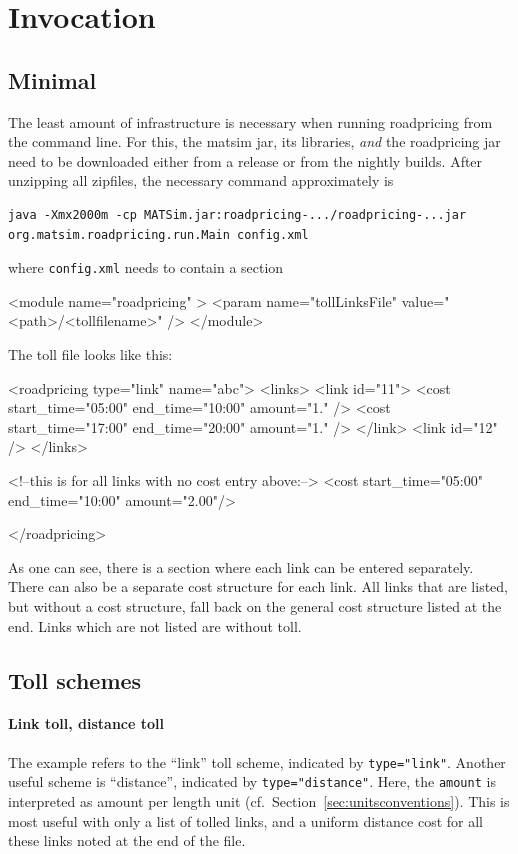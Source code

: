

\section{Invocation}

\subsection{Minimal}

The least amount of infrastructure is necessary when running roadpricing from the command line.  For this, the \acrshort{matsim} jar, its libraries, \emph{and} the roadpricing jar need to be downloaded either from a release or from the nightly builds.   After unzipping all zipfiles, the necessary command approximately is
\begin{lstlisting}
java -Xmx2000m -cp MATSim.jar:roadpricing-.../roadpricing-...jar org.matsim.roadpricing.run.Main config.xml  
\end{lstlisting}
where \lstinline$config.xml$ needs to contain a section
\begin{xml}
	<module name="roadpricing" >
		<param name="tollLinksFile" value="<path>/<tollfilename>" />
	</module>
\end{xml}
The toll file looks like this:
\begin{xml}
<roadpricing type="link" name="abc">
   <links>
      <link id="11">
         <cost start_time="05:00" end_time="10:00" amount="1." />
         <cost start_time="17:00" end_time="20:00" amount="1." />
      </link>             
      <link id="12" />
   </links>

   <!--this is for all links with no cost entry above:-->
   <cost start_time="05:00" end_time="10:00" amount="2.00"/>

</roadpricing>
\end{xml}
As one can see, there is a section where each link can be entered separately.  There can also be a separate cost structure for each link.  All links that are listed, but without a cost structure, fall back on the general cost structure listed at the end.  Links which are not listed are without toll.

\subsection{Toll schemes}

\paragraph{Link toll, distance toll} The example refers to the ``link'' toll scheme, indicated by \lstinline$type="link"$. Another useful scheme is ``distance'', indicated by \lstinline$type="distance"$.  Here, the \lstinline$amount$ is interpreted as amount per length unit (cf.\ Section~\ref{sec:unitsconventions}).   This is most useful with only a list of tolled links, and a uniform distance cost for all these links noted at the end of the file.

